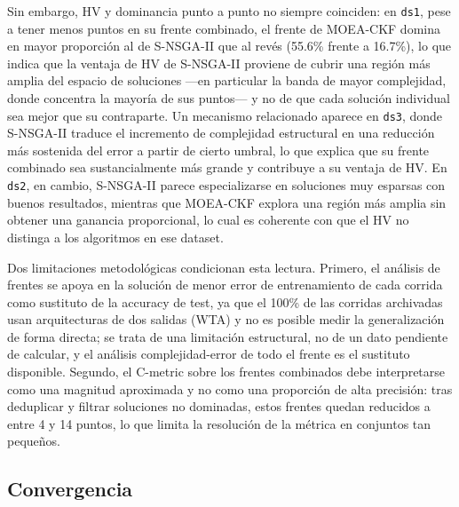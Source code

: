 Sin embargo, HV y dominancia punto a punto no siempre coinciden: en \texttt{ds1}, pese a tener menos puntos en su frente combinado, el frente de MOEA-CKF domina en mayor proporción al de S-NSGA-II que al revés (55.6\% frente a 16.7\%), lo que indica que la ventaja de HV de S-NSGA-II proviene de cubrir una región más amplia del espacio de soluciones —en particular la banda de mayor complejidad, donde concentra la mayoría de sus puntos— y no de que cada solución individual sea mejor que su contraparte. Un mecanismo relacionado aparece en \texttt{ds3}, donde S-NSGA-II traduce el incremento de complejidad estructural en una reducción más sostenida del error a partir de cierto umbral, lo que explica que su frente combinado sea sustancialmente más grande y contribuye a su ventaja de HV. En \texttt{ds2}, en cambio, S-NSGA-II parece especializarse en soluciones muy esparsas con buenos resultados, mientras que MOEA-CKF explora una región más amplia sin obtener una ganancia proporcional, lo cual es coherente con que el HV no distinga a los algoritmos en ese dataset.

Dos limitaciones metodológicas condicionan esta lectura. Primero, el análisis de frentes se apoya en la solución de menor error de entrenamiento de cada corrida como sustituto de la accuracy de test, ya que el 100\% de las corridas archivadas usan arquitecturas de dos salidas (WTA) y no es posible medir la generalización de forma directa; se trata de una limitación estructural, no de un dato pendiente de calcular, y el análisis complejidad-error de todo el frente es el sustituto disponible. Segundo, el C-metric sobre los frentes combinados debe interpretarse como una magnitud aproximada y no como una proporción de alta precisión: tras deduplicar y filtrar soluciones no dominadas, estos frentes quedan reducidos a entre 4 y 14 puntos, lo que limita la resolución de la métrica en conjuntos tan pequeños.

\subsection{Convergencia}

